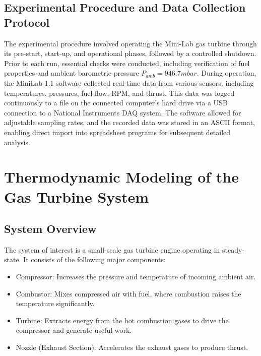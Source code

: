 \documentclass[
  12pt,
  oneside,
  a4paper,
  english,
  brazil]{abntex2}
\begin{document}
\subsection{Experimental Procedure and Data Collection
Protocol}\label{experimental-procedure-and-data-collection-protocol}

The experimental procedure involved operating the Mini-Lab gas turbine
through its pre-start, start-up, and operational phases, followed by a
controlled shutdown. Prior to each run, essential checks were conducted,
including verification of fuel properties and ambient barometric
pressure \(P_{amb}=946.7 mbar\). During operation, the MiniLab 1.1
software collected real-time data from various sensors, including
temperatures, pressures, fuel flow, RPM, and thrust. This data was
logged continuously to a file on the connected computer's hard drive via
a USB connection to a National Instruments DAQ system. The software
allowed for adjustable sampling rates, and the recorded data was stored
in an ASCII format, enabling direct import into spreadsheet programs for
subsequent detailed analysis.

\section{Thermodynamic Modeling of the Gas Turbine
System}\label{thermodynamic-modeling-of-the-gas-turbine-system}

\subsection{System Overview}\label{system-overview}

The system of interest is a small-scale gas turbine engine operating in
steady-state. It consists of the following major components:

\begin{itemize}
    \item Compressor: Increases the pressure and temperature of incoming ambient air.
    \item Combustor: Mixes compressed air with fuel, where combustion raises the temperature significantly.
    \item Turbine: Extracts energy from the hot combustion gases to drive the compressor and generate useful work.
    \item Nozzle (Exhaust Section): Accelerates the exhaust gases to produce thrust.
\end{itemize}
\end{document}
